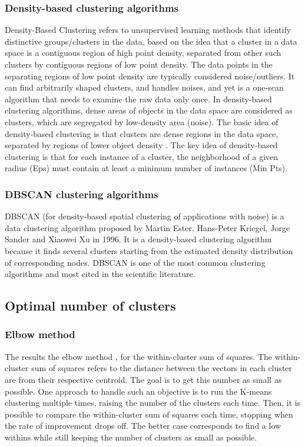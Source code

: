\subsubsection{Density-based clustering algorithms}
\label{subsub:density_based_c}
Density-Based Clustering refers to  unsupervised learning methods that identify distinctive groups/clusters in the data, based on the idea that a cluster in a data space is a contiguous region of high point density, separated from other such clusters by contiguous regions of low point density. The data points in the separating regions of low point density are typically considered noise/outliers.
It can find arbitrarily shaped clusters, and handles noises, and yet is a one-scan algorithm that needs to examine the raw data only once. In density-based clustering algorithms, dense areas of objects in the data space are considered as clusters, which are segregated by low-density area (noise). The basic idea of density-based clustering is that clusters are dense regions in the data space, separated by regions of lower object density .
The key idea of density-based clustering is that for each instance of a cluster, the neighborhood of a given radius (Eps) must contain at least a minimum number of instances (Min Pts).

\subsubsection{DBSCAN clustering algorithms}
\label{subsub:dbscan}
DBSCAN (for density-based spatial clustering of applications with noise) is a data clustering algorithm proposed by Martin Ester, Hans-Peter Kriegel, Jorge Sander and Xiaowei Xu in 1996. It is a density-based clustering algorithm because it finds several clusters starting from the estimated density distribution of corresponding nodes. DBSCAN \cite{Kisilevich2010PDBSCANAD} is one of the most common clustering algorithms and most cited in the scientific literature.

\subsection{Optimal number of clusters}

\subsubsection{Elbow method}
\label{subsub:elbow_method}
The results the elbow method \cite{Kodinariya2013ReviewOD}, for the within-cluster sum of squares. The within-cluster sum of squares refers to the distance between the vectors in each cluster are from their respective centroid. The goal is to get this number as small as possible. One approach to handle such an objective is to run the K-means clustering multiple times, raising the number of the clusters each time. Then, it is possible to compare the within-cluster sum of squares each time, stopping when the rate of improvement drops off. The better case corresponds to find a low withins while still keeping the number of clusters as small as possible.\\

